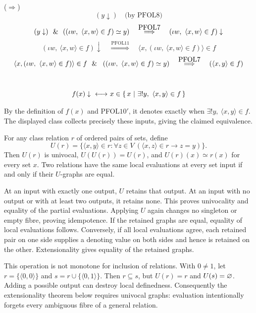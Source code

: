 \noindent($\Rightarrow$)
\[(y\downarrow)\quad\mbox{(by PFOL8)}\]
\[
(y\downarrow)\ \ \&\ \ ((\iota w,\ \langle x,w\rangle\in f)\simeq y) \quad\overset{\mbox{PFOL7}}{\Longrightarrow}\quad
(\iota w,\ \langle x,w\rangle\in f)\downarrow \]
\[
\left(\iota w,\ \langle x,w\rangle\in f\right)\downarrow
\quad\overset{\mbox{PFOL11}}{\Longrightarrow}\quad
\langle x,(\iota w,\ \langle x,w\rangle\in f)\rangle\in f
\]
\[
\langle x,(\iota w,\ \langle x,w\rangle\in f)\rangle\in f
\ \ \&\ \ 
\left((\iota w,\ \langle x,w\rangle\in f)\simeq y\right)
\quad\overset{\mbox{PFOL7}}{\Longrightarrow}\quad
\left(\langle x, y\rangle\in f\right)
\]
\\
\Done
\begin{theorem}
\[
f(x)\downarrow {\ \longleftrightarrow\ } x\in\left\{\,x\ \middle|\ \exists!y,\ \langle x,y\rangle\in f\,\right\}
\]
\end{theorem}
\Proof
By the definition of $f(x)$ and PFOL$10'$, it denotes exactly when
$\exists!y,\ \langle x,y\rangle\in f$. The displayed class collects
precisely these inputs, giving the claimed equivalence.
\Done
\begin{theorem}
For any class relation $r$ of ordered pairs of sets, define
\[
U(r)=\{\langle x,y\rangle\in r:
       \forall z\in V\ (\langle x,z\rangle\in r\to z=y)\}.
\]
Then $U(r)$ is univocal, $U(U(r))=U(r)$, and
$U(r)(x)\simeq r(x)$ for every set $x$. Two relations have the same
local evaluations at every set input if and only if their $U$-graphs
are equal.
\end{theorem}
\Proof
At an input with exactly one output, $U$ retains that output. At an
input with no output or with at least two outputs, it retains none.
This proves univocality and equality of the partial evaluations. Applying
$U$ again changes no singleton or empty fibre, proving idempotence.
If the retained graphs are equal, equality of local evaluations follows.
Conversely, if all local evaluations agree, each retained pair on one
side supplies a denoting value on both sides and hence is retained on
the other. Extensionality gives equality of the retained graphs.
\Done

This operation is not monotone for inclusion of relations. With
$0\ne1$, let $r=\{\langle0,0\rangle\}$ and
$s=r\cup\{\langle0,1\rangle\}$. Then $r\subseteq s$, but
$U(r)=r$ and $U(s)=\varnothing$. Adding a possible output can destroy
local definedness. Consequently the extensionality theorem below
requires univocal graphs: evaluation intentionally forgets every
ambiguous fibre of a general relation.

